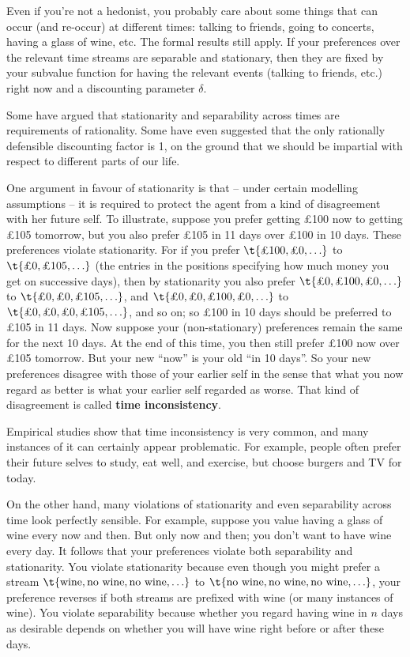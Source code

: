 Even if you're not a hedonist, you probably care about some things
that can occur (and re-occur) at different times: talking to friends,
going to concerts, having a glass of wine, etc. The formal results
still apply. If your preferences over the relevant time streams are
separable and stationary, then they are fixed by your subvalue
function for having the relevant events (talking to friends, etc.)
right now and a discounting parameter $\delta$.

Some have argued that stationarity and separability across times are
requirements of rationality. Some have even suggested that the only
rationally defensible discounting factor is 1, on the ground that we
should be impartial with respect to different parts of our life.

One argument in favour of stationarity is that -- under certain
modelling assumptions -- it is required to protect the agent from a
kind of disagreement with her future self. To illustrate, suppose you
prefer getting £100 now to getting £105 tomorrow, but you also prefer
£105 in 11 days over £100 in 10 days. These preferences violate
stationarity. For if you prefer $\t{\text{£100}, \text{£0}, \ldots}$
to $\t{\text{£0}, \text{£105}, \ldots}$ (the entries in the positions
specifying how much money you get on successive days), then by
stationarity you also prefer $\t{\text{£0}, \text{£100}, \text{£0},
  \ldots}$ to $\t{\text{£0}, \text{£0}, \text{£105}, \ldots}$, and
$\t{\text{£0}, \text{£0}, \text{£100}, \text{£0}, \ldots}$ to
$\t{\text{£0}, \text{£0}, \text{£0}, \text{£105}, \ldots}$, and so on;
so £100 in 10 days should be preferred to £105 in 11 days. Now suppose
your (non-stationary) preferences remain the same for the next 10
days. At the end of this time, you then still prefer £100 now over
£105 tomorrow. But your new ``now'' is your old ``in 10 days''. So
your new preferences disagree with those of your earlier self in the
sense that what you now regard as better is what your earlier self
regarded as worse. That kind of disagreement is called \textbf{time
  inconsistency}.

Empirical studies show that time inconsistency is very common, and
many instances of it can certainly appear problematic. For example,
people often prefer their future selves to study, eat well, and
exercise, but choose burgers and TV for today.

On the other hand, many violations of stationarity and even
separability across time look perfectly sensible. For example, suppose
you value having a glass of wine every now and then. But only now and
then; you don't want to have wine every day. It follows that your
preferences violate both separability and stationarity. You violate
stationarity because even though you might prefer a stream
$\t{\text{wine}, \text{no wine}, \text{no wine}, \ldots}$ to
$\t{\text{no wine}, \text{no wine}, \text{no wine}, \ldots}$, your
preference reverses if both streams are prefixed with wine (or many
instances of wine). You violate separability because whether you
regard having wine in $n$ days as desirable depends on whether you
will have wine right before or after these days. 

